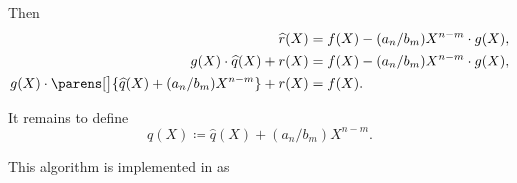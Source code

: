 \begin{algorithm}
\begin{thmenum}
    Then
    \begin{align*}
      \widehat r(X)                                                          &= f(X) - (a_n / b_m) X^{n-m} \cdot g(X), \\
      g(X) \cdot \widehat q(X) + r(X)                                        &= f(X) - (a_n / b_m) X^{n-m} \cdot g(X), \\
      g(X) \cdot \parens[\big]{ \widehat q(X) + (a_n / b_m) X^{n-m} } + r(X) &= f(X).
    \end{align*}

    It remains to define
    \begin{equation*}
      q(X) \coloneqq \widehat q(X) + (a_n / b_m) X^{n-m}.
    \end{equation*}
  \end{thmenum}
\end{algorithm}
\begin{comments}
  \item This algorithm is implemented in \cite{notebook:code} as
  \begin{CodeRefDisplay}
  \end{CodeRefDisplay}
\end{comments}
